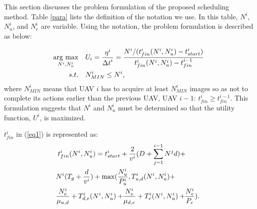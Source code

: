 \documentclass{ieeeaccess}
\newcommand{\argmax}{\mathop{\rm arg~max}\limits}
\begin{document}
This section discusses the problem formulation of the proposed scheduling method.
%
Table \ref{para} lists the definition of the notation we use.
%
In this table, $N^i$, $N_u^i$, and $N_e^i$ are variable.
%
Using the notation, the problem formulation is described as below:

\begin{align}
\argmax_{N^i,N_u^i} \quad&  U_i =\frac{\eta^{i}}{{\Delta{t}}^i}  = \frac{N^i / (t_{fin}^i(N^i,N_u^i)-t_{start}^i)}{t_{fin}^i(N^i,N_u^i)-t_{fin}^{i-1}}\label{eq1}\\
s.t. \quad& {N_{MIN}^i}\leq{N^i}, \label{eq2}
\end{align}
where $N_{MIN}^i$ means that UAV $i$ has to acquire at least $N_{MIN}^i$ images so as not to complete its actions earlier than the previous UAV, UAV $i-1$: ${t_{fin}^i}\geq{t_{fin}^{i-1}}$.
This formulation suggests that $N^i$ and $N_u^i$ must be determined so that the utility function, $U^i$, is maximized.

$t_{fin}^i$ in (\ref{eq1}) is represented as:
\begin{align}
&t_{fin}^i(N^i,N_u^i)=t_{start}^i+\frac{2}{v^i}(D+\sum_{j=1}^{i-1}{N^{j}d})+\nonumber\\
&\hspace{-1mm}N^i({T_g+\frac{d}{v^i}})+\max(\frac{N_u^i}{P_u^i},T_{u,d}^{i}(N^i,N_u^i)+\nonumber\\
&\hspace{-1mm}\frac{N_e^i}{\mu_{u,d}}+T_{d,e}^{i}(N^i,N_u^i)+\hspace{-1mm}\frac{N_e^i}{\mu_{d,e}}+T_{e}^{i}(N^i,N_u^i)+\hspace{-1mm}\frac{N_e^i}{P_e}). \label{eq_fin}
\end{align}
\end{document}
